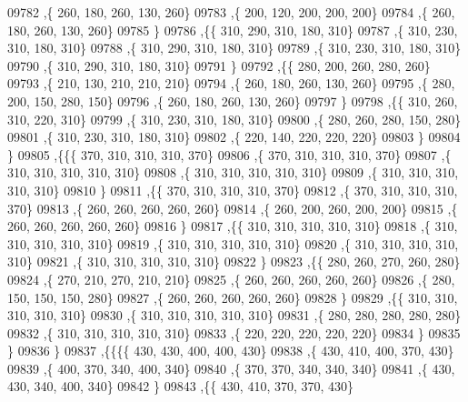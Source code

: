 \begin{DoxyCode}
09782     ,\{   260,   180,   260,   130,   260\}
09783     ,\{   200,   120,   200,   200,   200\}
09784     ,\{   260,   180,   260,   130,   260\}
09785     \}
09786    ,\{\{   310,   290,   310,   180,   310\}
09787     ,\{   310,   230,   310,   180,   310\}
09788     ,\{   310,   290,   310,   180,   310\}
09789     ,\{   310,   230,   310,   180,   310\}
09790     ,\{   310,   290,   310,   180,   310\}
09791     \}
09792    ,\{\{   280,   200,   260,   280,   260\}
09793     ,\{   210,   130,   210,   210,   210\}
09794     ,\{   260,   180,   260,   130,   260\}
09795     ,\{   280,   200,   150,   280,   150\}
09796     ,\{   260,   180,   260,   130,   260\}
09797     \}
09798    ,\{\{   310,   260,   310,   220,   310\}
09799     ,\{   310,   230,   310,   180,   310\}
09800     ,\{   280,   260,   280,   150,   280\}
09801     ,\{   310,   230,   310,   180,   310\}
09802     ,\{   220,   140,   220,   220,   220\}
09803     \}
09804    \}
09805   ,\{\{\{   370,   310,   310,   310,   370\}
09806     ,\{   370,   310,   310,   310,   370\}
09807     ,\{   310,   310,   310,   310,   310\}
09808     ,\{   310,   310,   310,   310,   310\}
09809     ,\{   310,   310,   310,   310,   310\}
09810     \}
09811    ,\{\{   370,   310,   310,   310,   370\}
09812     ,\{   370,   310,   310,   310,   370\}
09813     ,\{   260,   260,   260,   260,   260\}
09814     ,\{   260,   200,   260,   200,   200\}
09815     ,\{   260,   260,   260,   260,   260\}
09816     \}
09817    ,\{\{   310,   310,   310,   310,   310\}
09818     ,\{   310,   310,   310,   310,   310\}
09819     ,\{   310,   310,   310,   310,   310\}
09820     ,\{   310,   310,   310,   310,   310\}
09821     ,\{   310,   310,   310,   310,   310\}
09822     \}
09823    ,\{\{   280,   260,   270,   260,   280\}
09824     ,\{   270,   210,   270,   210,   210\}
09825     ,\{   260,   260,   260,   260,   260\}
09826     ,\{   280,   150,   150,   150,   280\}
09827     ,\{   260,   260,   260,   260,   260\}
09828     \}
09829    ,\{\{   310,   310,   310,   310,   310\}
09830     ,\{   310,   310,   310,   310,   310\}
09831     ,\{   280,   280,   280,   280,   280\}
09832     ,\{   310,   310,   310,   310,   310\}
09833     ,\{   220,   220,   220,   220,   220\}
09834     \}
09835    \}
09836   \}
09837  ,\{\{\{\{   430,   430,   400,   400,   430\}
09838     ,\{   430,   410,   400,   370,   430\}
09839     ,\{   400,   370,   340,   400,   340\}
09840     ,\{   370,   370,   340,   340,   340\}
09841     ,\{   430,   430,   340,   400,   340\}
09842     \}
09843    ,\{\{   430,   410,   370,   370,   430\}

\end{DoxyCode}

